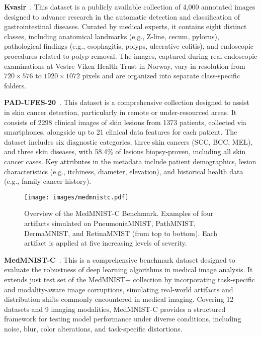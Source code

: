 \documentclass[times,twocolumn,final]{elsarticle}
\begin{document}
\textbf{Kvasir}~\cite{pogorelov2017kvasir}. This dataset is a publicly available collection of 4,000 annotated images designed to advance research in the automatic detection and classification of gastrointestinal diseases. Curated by medical experts, it contains eight distinct classes, including anatomical landmarks (e.g., Z-line, cecum, pylorus), pathological findings (e.g., esophagitis, polyps, ulcerative colitis), and endoscopic procedures related to polyp removal. The images, captured during real endoscopic examinations at Vestre Viken Health Trust in Norway, vary in resolution from $720\times576$ to $1920\times1072$ pixels and are organized into separate class-specific folders.

\textbf{PAD-UFES-20}~\cite{pacheco2020pad}. This dataset is a comprehensive collection designed to assist in skin cancer detection, particularly in remote or under-resourced areas. It consists of 2298 clinical images of skin lesions from 1373 patients, collected via smartphones, alongside up to 21 clinical data features for each patient. The dataset includes six diagnostic categories, three skin cancers (SCC, BCC, MEL), and three skin diseases, with 58.4\% of lesions biopsy-proven, including all skin cancer cases. Key attributes in the metadata include patient demographics, lesion characteristics (e.g., itchiness, diameter, elevation), and historical health data (e.g., family cancer history).

\begin{figure*}[t]
    \centering
    \texttt{[image: images/medmnistc.pdf]}
    \caption{{Overview of the MedMNIST-C Benchmark.} Examples of four artifacts simulated on PneumoniaMNIST, PathMNIST, DermaMNIST, and RetinaMNIST (from top to bottom). Each artifact is applied at five increasing levels of severity.}
    \label{fig:medmnistc}
\end{figure*}



\textbf{MedMNIST-C}~\cite{di2024medmnist}. This is a comprehensive benchmark dataset designed to evaluate the robustness of deep learning algorithms in medical image analysis. It extends just test set of the MedMNIST+ collection by incorporating task-specific and modality-aware image corruptions, simulating real-world artifacts and distribution shifts commonly encountered in medical imaging. Covering 12 datasets and 9 imaging modalities, MedMNIST-C provides a structured framework for testing model performance under diverse conditions, including noise, blur, color alterations, and task-specific distortions.
\end{document}
